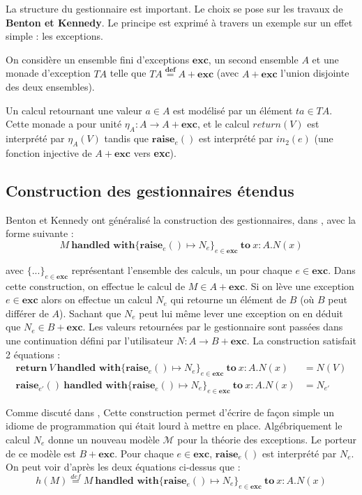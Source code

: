 
La structure du gestionnaire est important. Le choix se pose sur les travaux de \textbf{Benton et Kennedy}. Le principe est exprimé à travers un exemple sur un effet simple : les exceptions.
\medbreak

On considère un ensemble fini d'exceptions $\textbf{exc}$, un second ensemble $A$ et 
une monade d'exception $TA$ telle que $TA \overset{\textbf{def}}{=} A + \textbf{exc}$ 
(avec $A + \textbf{exc}$ l'union disjointe des deux ensembles). 

Un calcul retournant une valeur $a \in A$ est modélisé par un élément $ta \in TA$. 
Cette monade a pour unité $\eta_A : A \rightarrow A + \textbf{exc}$, et le calcul 
$return(V)$ est interprété par $\eta_A(V)$ tandis que $\textbf{raise}_e()$ est 
interprété par $in_2(e)$ (une fonction injective de $A + \textbf{exc}$ vers \textbf{exc}).

\subsection{Construction des gestionnaires étendus}

	Benton et Kennedy ont généralisé la construction des gestionnaires, dans \cite{DBLP:journals/jfp/BentonK01}, avec la forme suivante :
	\[M~\textbf{handled~with} \{\textbf{raise}_e() \mapsto N_e\}_{e \in \textbf{exc}}~\textbf{to}~ x:A.N(x)\]
	
	avec $\{...\}_{e \in \textbf{exc}}$ représentant l'ensemble des calculs, un pour chaque $e \in \textbf{exc}$. Dans cette construction, 
	on effectue le calcul de $M \in A + \textbf{exc}$. Si on lève une exception 
	$e \in \textbf{exc}$ alors on effectue un calcul $N_e$ qui retourne un élément de $B$
	(où $B$ peut différer de $A$). Sachant que $N_e$ peut lui même lever une exception 
	on en déduit que $N_e \in B + \textbf{exc}$. Les valeurs retournées par le gestionnaire sont passées dans une continuation défini par l'utilisateur $N : A \rightarrow B + \textbf{exc}$. La construction satisfait 2 équations :
	\begin{align*}
		\textbf{return} ~V~\textbf{handled~with} \{\textbf{raise}_e() \mapsto N_e\}_{e \in \textbf{exc}}~\textbf{to}~ x:A.N(x) &= N(V)\\
		\textbf{raise}_{e'}()~\textbf{handled~with} \{\textbf{raise}_e() \mapsto N_e\}_{e \in \textbf{exc}}~\textbf{to}~ x:A.N(x) &= N_{e'}
	\end{align*}
	
	Comme discuté dans , Cette construction permet d'écrire de façon simple un idiome de programmation qui était lourd à mettre en place. 
	\smallbreak
	Algébriquement le calcul $N_e$ donne un nouveau modèle $\mathcal{M}$ pour la théorie des exceptions. Le porteur de ce modèle est $B + \textbf{exc}$. Pour chaque $e \in \textbf{exc}$, $\textbf{raise}_e()$ est interprété par $N_e$. On peut voir d'après les deux équations ci-dessus que :
	\[h(M) \overset{def}{=} M~\textbf{handled~with} \{\textbf{raise}_e() \mapsto N_e\}_{e \in \textbf{exc}}~\textbf{to}~ x:A.N(x)\]
	
